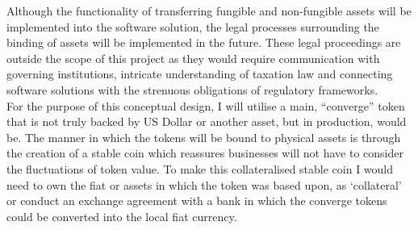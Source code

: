 Although the functionality of transferring fungible and non-fungible assets will be implemented into the software solution, the legal processes surrounding the binding of assets will be implemented in the future. These legal proceedings are outside the scope of this project as they would require communication with governing institutions, intricate understanding of taxation law and connecting software solutions with the strenuous obligations of regulatory frameworks. \\

For the purpose of this conceptual design, I will utilise a main, “converge” token that is not truly backed by US Dollar or another asset, but in production, would be. The manner in which the tokens will be bound to physical assets is through the creation of a stable coin which reassures businesses will not have to consider the fluctuations of token value. To make this collateralised stable coin I would need to own the fiat or assets in which the token was based upon, as ‘collateral’ or conduct an exchange agreement with a bank in which the converge tokens could be converted into the local fiat currency. \\



